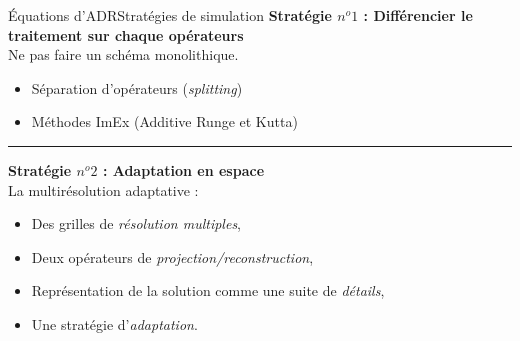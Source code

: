 \begin{frame}{Équations d'ADR}{Stratégies de simulation}
    \textbf{Stratégie $n^o1$ : Différencier le traitement sur chaque opérateurs}\\
        Ne pas faire un schéma monolithique.
        \begin{itemize}
            \item Séparation d'opérateurs (\emph{splitting})
            \item Méthodes ImEx (Additive Runge et Kutta)
        \end{itemize}
        \pause
\noindent\color{Primary}\rule{\linewidth}{0.6pt}\color{black}

    \textbf{Stratégie $n^o2$ : Adaptation en espace}\\
        La multirésolution adaptative : 
        \begin{itemize}
            \item Des grilles de \emph{résolution multiples},
            \item Deux opérateurs de \emph{projection/reconstruction},
            \item Représentation de la solution comme une suite de \emph{détails},
            \item Une stratégie d'\emph{adaptation}.
        \end{itemize}
    \color{red}
\end{frame}